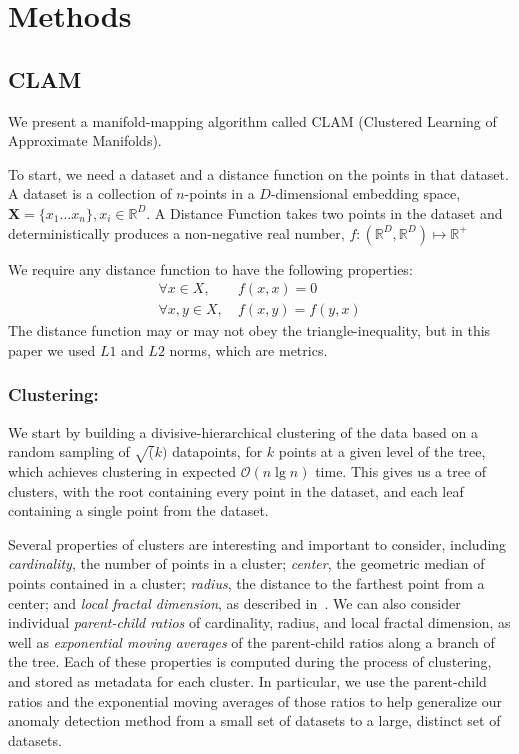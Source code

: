 \section{Methods}
\label{sec:methods}

\subsection{CLAM}
\label{subsec:methods:clam}

We present a manifold-mapping algorithm called CLAM (Clustered Learning of Approximate Manifolds).

To start, we need a dataset and a distance function on the points in that dataset.
A dataset is a collection of $n$-points in a $D$-dimensional embedding space, $\textbf{X} = \{x_1 \dots x_n\}, x_i \in \mathbb{R}^D$.
A Distance Function takes two points in the dataset and deterministically produces a non-negative real number, $f : (\mathbb{R}^D, \mathbb{R}^D) \mapsto \mathbb{R}^+$

We require any distance function to have the following properties:
\begin{align*}
    \forall x \in X,    & \ f(x, x) = 0       \\
    \forall x, y \in X, & \ f(x, y) = f(y, x)
\end{align*}
The distance function may or may not obey the triangle-inequality, but in this paper we used $L1$ and $L2$ norms, which are metrics.

\subsubsection{Clustering:}\label{subsubsec:methods:clam:clustering}
We start by building a divisive-hierarchical clustering of the data based on a random sampling of $\sqrt(k)$ datapoints, for $k$ points at a given level of the tree, which achieves clustering in expected $\mathcal{O}(n \lg n)$ time.
This gives us a tree of clusters, with the root containing every point in the dataset, and each leaf containing a single point from the dataset.

Several properties of clusters are interesting and important to consider, including \textit{cardinality}, the number of points in a cluster; \textit{center}, the geometric median of points contained in a cluster; \textit{radius}, the distance to the farthest point from a center; and \textit{local fractal dimension}, as described in~\cite{ishaq2019clustered}.
We can also consider individual \textit{parent-child ratios} of cardinality, radius, and local fractal dimension, as well as \textit{exponential moving averages} of the parent-child ratios along a branch of the tree.
Each of these properties is computed during the process of clustering, and stored as metadata for each cluster.
In particular, we use the parent-child ratios and the exponential moving averages of those ratios to help generalize our anomaly detection method from a small set of datasets to a large, distinct set of datasets.

